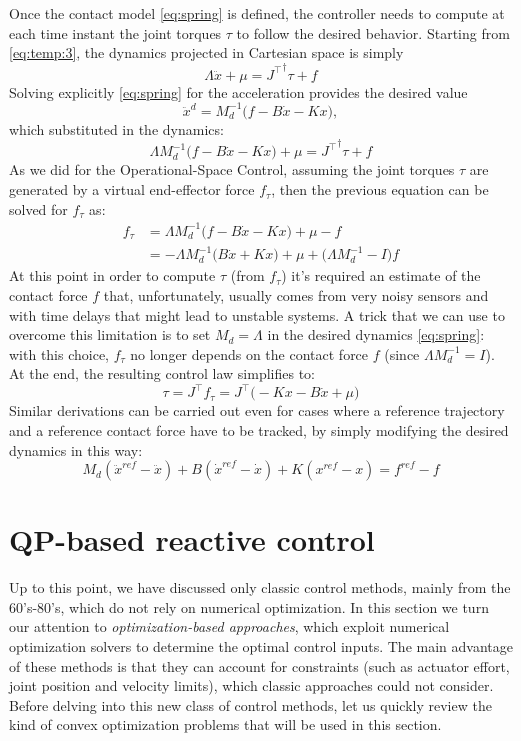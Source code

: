 	Once the contact model \eqref{eq:spring} is defined, the controller needs to compute at each time instant the joint torques $\tau$ to follow the desired behavior. 
	Starting from \eqref{eq:temp:3}, the dynamics projected in Cartesian space is simply 
	$$
	\Lambda \ddot x + \mu = {J^\top}^\dagger \tau + f
	$$
	Solving explicitly \eqref{eq:spring} for the acceleration provides the desired value 
	$$
	\ddot x^d = M_d^{-1}\big(f-B\dot x - Kx\big),
	$$ 
	which substituted in the dynamics:
	\[ \Lambda M_d^{-1}\big(f - B\dot x - K x\big) + \mu = {J^\top}^\dagger \tau + f \]
	As we did for the Operational-Space Control, assuming the joint torques $\tau$ are generated by a virtual end-effector force $f_\tau$, then the previous equation can be solved for $f_\tau$ as:
	\begin{align*}
		f_\tau & = \Lambda M_d ^{-1} \big( f - B\dot x - Kx \big) + \mu - f \\
		& = -\Lambda M_d^{-1}\big(B\dot x + K x\big) + \mu + \big(\Lambda M_d^{-1} - I\big) f
	\end{align*}
	At this point in order to compute $\tau$ (from $f_\tau$) it's required an estimate of the contact force $f$ that, unfortunately, usually comes from very noisy sensors and with time delays that might lead to unstable systems. A trick that we can use to overcome this limitation is to set $M_d = \Lambda$ in the desired dynamics \eqref{eq:spring}: with this choice, $f_\tau$ no longer depends on the contact force $f$ (since $\Lambda M_d^{-1} = I$). 
	At the end, the resulting control law simplifies to:
	\begin{equation}
		\tau = J^\top f_\tau = J^\top \big(-Kx - B\dot x + \mu\big)
	\end{equation}
	Similar derivations can be carried out even for cases where a reference trajectory and a reference contact force have to be tracked, by simply modifying the desired dynamics in this way:
	\begin{equation} \label{eq:spring}
		M_d (\ddot x^{ref} - \ddot x) + B (\dot x^{ref} - \dot x) + K (x^{ref} - x) = f^{ref} - f
	\end{equation}
	
\section{QP-based reactive control}
	Up to this point, we have discussed only classic control methods, mainly from the 60's-80's, which do not rely on numerical optimization. In this section we turn our attention to \textit{optimization-based approaches}, which exploit numerical optimization solvers to determine the optimal control inputs. The main advantage of these methods is that they can account for constraints (such as actuator effort, joint position and velocity limits), which classic approaches could not consider.
	Before delving into this new class of control methods, let us quickly review the kind of convex optimization problems that will be used in this section.
	
